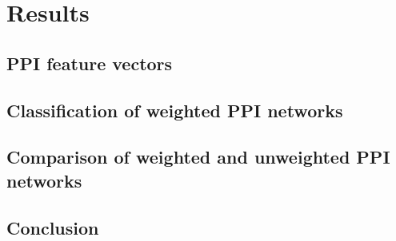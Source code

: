 \chapter{Results}
\label{results}



\section{PPI feature vectors}






\section{Classification of weighted PPI networks}




\section{Comparison of weighted and unweighted PPI networks}



\section*{Conclusion}


